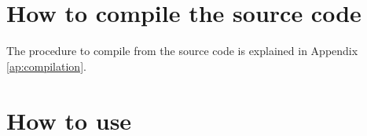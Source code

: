 \documentclass[a4paper,fleqn]{book}
\begin{document}
%
%

\section{How to compile the source code}

The procedure to compile from the source code is explained in Appendix \ref{ap:compilation}.


\section{How to use}
\label{sec:howto}
\end{document}

